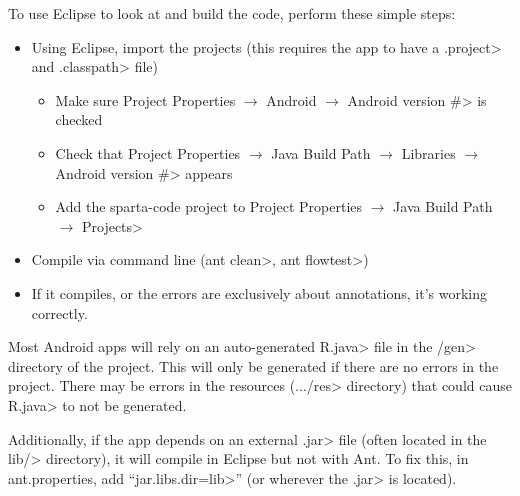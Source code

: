 To use Eclipse to look at and build the code, perform these simple
steps:
\begin{itemize}
\item
Using Eclipse, import the projects (this requires the app to have a
\<.project> and \<.classpath> file)
  \begin{itemize}
    \item
    Make sure
    \<Project Properties $\rightarrow$ Android $\rightarrow$ Android
    version \#> is checked

    \item
    Check that
    \<Project Properties $\rightarrow$ Java Build Path $\rightarrow$
    Libraries $\rightarrow$ Android version \#> appears

    \item
    Add the sparta-code project to
    \<Project Properties $\rightarrow$ Java Build Path $\rightarrow$ Projects>
    
  \end{itemize}

\item Compile via command line (\<ant clean>, \<ant flowtest>)

\item If it compiles, or the errors are exclusively about annotations,
  it's working correctly.
\end{itemize}

Most Android apps will rely on an auto-generated \<R.java> file
in the \</gen> directory of the project. This will only be generated
if there are no errors in the project. There may be errors in the
resources (\<.../res> directory) that could cause \<R.java> to not be
generated.

Additionally, if the app depends on an external \<.jar> file (often
located in the \<lib/> directory), it will compile in Eclipse but not
with Ant. To fix this, in ant.properties, add ``\<jar.libs.dir=lib>''
(or wherever the \<.jar> is located).



